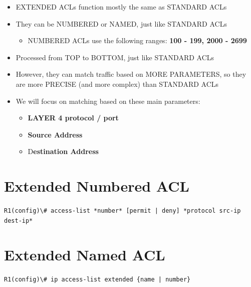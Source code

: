 \begin{itemize}
\tightlist
\item
  EXTENDED ACLs function mostly the same as STANDARD ACLs
\item
  They can be NUMBERED or NAMED, just like STANDARD ACLs

  \begin{itemize}
  \tightlist
  \item
    NUMBERED ACLs use the following ranges: \textbf{100 - 199, 2000 -
    2699}
  \end{itemize}
\item
  Processed from TOP to BOTTOM, just like STANDARD ACLs
\item
  However, they can match traffic based on MORE PARAMETERS, so they are
  more PRECISE (and more complex) than STANDARD ACLs
\item
  We will focus on matching based on these main parameters:

  \begin{itemize}
  \tightlist
  \item
    \textbf{LAYER 4 protocol / port}
  \item
    \textbf{Source Address}
  \item
    D\textbf{estination Address}
  \end{itemize}
\end{itemize}

\section{Extended Numbered ACL}\label{extended-numbered-acl}

\begin{tipbox}

\passthrough{\lstinline!R1(config)\# access-list *number* [permit | deny] *protocol src-ip dest-ip*!}

\end{tipbox}

\section{Extended Named ACL}\label{extended-named-acl}

\begin{tipbox}

\passthrough{\lstinline!R1(config)\# ip access-list extended \{name | number\}!}

\end{tipbox}

